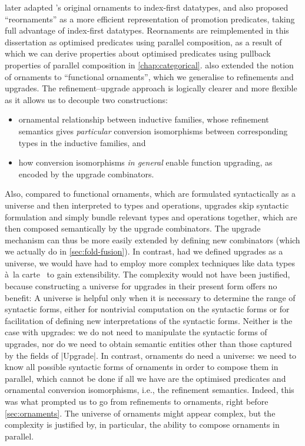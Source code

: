 \citet{Dagand-functional-ornaments} later adapted \citeauthor{McBride-ornaments}'s original ornaments to index-first datatypes, and also proposed ``reornaments'' as a more efficient representation of promotion predicates, taking full advantage of index-first datatypes.
Reornaments are reimplemented in this dissertation as optimised predicates using parallel composition, as a result of which we can derive properties about optimised predicates using pullback properties of parallel composition in \autoref{chap:categorical}.
\citeauthor{Dagand-functional-ornaments} also extended the notion of ornaments to ``functional ornaments'', which we generalise to refinements and upgrades.
The refinement--upgrade approach is logically clearer and more flexible as it allows us to decouple two constructions:
\begin{itemize}
\item ornamental relationship between inductive families, whose refinement semantics gives \emph{particular} conversion isomorphisms between corresponding types in the inductive families, and
\item how conversion isomorphisms \emph{in general} enable function upgrading, as encoded by the upgrade combinators.
\end{itemize}
Also, compared to functional ornaments, which are formulated syntactically as a universe and then interpreted to types and operations, upgrades skip syntactic formulation and simply bundle relevant types and operations together, which are then composed semantically by the upgrade combinators.
The upgrade mechanism can thus be more easily extended by defining new combinators (which we actually do in \autoref{sec:fold-fusion}).
In contrast, had we defined upgrades as a universe, we would have had to employ more complex techniques like data types à~la carte~\citep{Swierstra-data-types-a-la-carte} to gain extensibility.
The complexity would not have been justified, because constructing a universe for upgrades in their present form offers no benefit:
A universe is helpful only when it is necessary to determine the range of syntactic forms, either for nontrivial computation on the syntactic forms or for facilitation of defining new interpretations of the syntactic forms.
Neither is the case with upgrades: we do not need to manipulate the syntactic forms of upgrades, nor do we need to obtain semantic entities other than those captured by the fields of |Upgrade|.
In contrast, ornaments do need a universe: we need to know all possible syntactic forms of ornaments in order to compose them in parallel, which cannot be done if all we have are the optimised predicates and ornamental conversion isomorphisms, i.e., the refinement semantics.
Indeed, this was what prompted us to go from refinements to ornaments, right before \autoref{sec:ornaments}.
The universe of ornaments might appear complex, but the complexity is justified by, in particular, the ability to compose ornaments in parallel.


